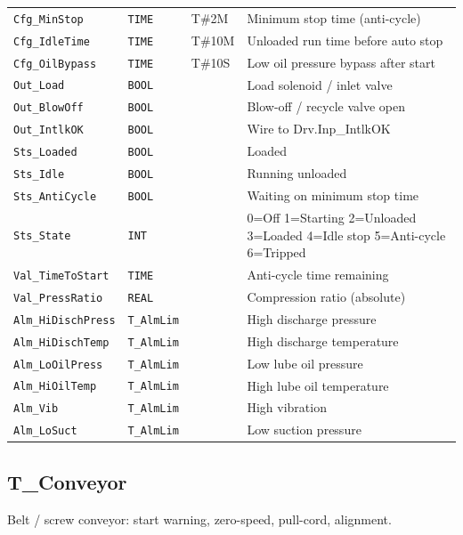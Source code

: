 \begin{small}
\begin{longtable}{@{}P{3.70cm}P{2.20cm}P{1.70cm}P{8.91cm}@{}}
\texttt{Cfg\_MinStop} & \texttt{TIME} & T\#2M & Minimum stop time (anti-cycle) \\
\texttt{Cfg\_IdleTime} & \texttt{TIME} & T\#10M & Unloaded run time before auto stop \\
\texttt{Cfg\_OilBypass} & \texttt{TIME} & T\#10S & Low oil pressure bypass after start \\
\texttt{Out\_Load} & \texttt{BOOL} &  & Load solenoid /\allowbreak{} inlet valve \\
\texttt{Out\_BlowOff} & \texttt{BOOL} &  & Blow-off /\allowbreak{} recycle valve open \\
\texttt{Out\_IntlkOK} & \texttt{BOOL} &  & Wire to Drv.Inp\_IntlkOK \\
\texttt{Sts\_Loaded} & \texttt{BOOL} &  & Loaded \\
\texttt{Sts\_Idle} & \texttt{BOOL} &  & Running unloaded \\
\texttt{Sts\_AntiCycle} & \texttt{BOOL} &  & Waiting on minimum stop time \\
\texttt{Sts\_State} & \texttt{INT} &  & 0=Off 1=Starting 2=Unloaded 3=Loaded 4=Idle stop 5=Anti-cycle 6=Tripped \\
\texttt{Val\_TimeToStart} & \texttt{TIME} &  & Anti-cycle time remaining \\
\texttt{Val\_PressRatio} & \texttt{REAL} &  & Compression ratio (absolute) \\
\texttt{Alm\_HiDischPress} & \texttt{T\_AlmLim} &  & High discharge pressure \\
\texttt{Alm\_HiDischTemp} & \texttt{T\_AlmLim} &  & High discharge temperature \\
\texttt{Alm\_LoOilPress} & \texttt{T\_AlmLim} &  & Low lube oil pressure \\
\texttt{Alm\_HiOilTemp} & \texttt{T\_AlmLim} &  & High lube oil temperature \\
\texttt{Alm\_Vib} & \texttt{T\_AlmLim} &  & High vibration \\
\texttt{Alm\_LoSuct} & \texttt{T\_AlmLim} &  & Low suction pressure \\
\bottomrule
\end{longtable}
\end{small}

\subsection{T\_Conveyor}\label{sec:pclib-t-conveyor}

Belt /\allowbreak{} screw conveyor: start warning, zero-speed, pull-cord, alignment.

